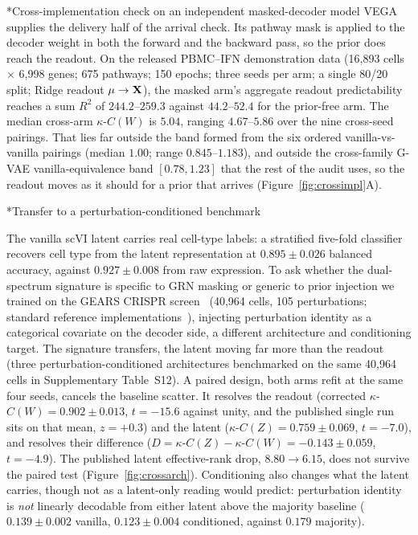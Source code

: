 \documentclass[11pt,a4paper]{article}
\makeatletter
\renewcommand{\subsection}{\@startsection{subsection}{2}{0pt}{10pt plus 4pt}{4pt}{\normalsize\bfseries}}
\makeatother
\begin{document}
\subsection*{Cross-implementation check on an independent masked-decoder model}
VEGA supplies the delivery half of the arrival check. Its pathway mask is applied to the decoder weight in both the forward and the backward pass, so the prior does reach the readout. On the released PBMC--IFN demonstration data (16,893 cells $\times$ 6,998 genes; 675 pathways; 150 epochs; three seeds per arm; a single 80/20 split; Ridge readout $\mu\to\mathbf{X}$), the masked arm's aggregate readout predictability reaches a sum $R^2$ of $244.2$--$259.3$ against $44.2$--$52.4$ for the prior-free arm. The median cross-arm $\kappa$-$C(W)$ is $5.04$, ranging $4.67$--$5.86$ over the nine cross-seed pairings. That lies far outside the band formed from the six ordered vanilla-vs-vanilla pairings (median $1.00$; range $0.845$--$1.183$), and outside the cross-family G-VAE vanilla-equivalence band $[0.78,1.23]$ that the rest of the audit uses, so the readout moves as it should for a prior that arrives (Figure~\ref{fig:crossimpl}A).

\subsection*{Transfer to a perturbation-conditioned benchmark}

The vanilla scVI latent carries real cell-type labels: a stratified five-fold classifier recovers cell type from the latent representation at $0.895\pm0.026$ balanced accuracy, against $0.927\pm0.008$ from raw expression. To ask whether the dual-spectrum signature is specific to GRN masking or generic to prior injection we trained on the GEARS CRISPR screen~\cite{roohani2024} (40,964 cells, 105 perturbations; standard reference implementations~\cite{dixit2016,replogle2022}), injecting perturbation identity as a categorical covariate on the decoder side, a different architecture and conditioning target. The signature transfers, the latent moving far more than the readout (three perturbation-conditioned architectures benchmarked on the same 40,964 cells in Supplementary Table~S12). A paired design, both arms refit at the same four seeds, cancels the baseline scatter. It resolves the readout (corrected $\kappa$-$C(W)=0.902\pm0.013$, $t=-15.6$ against unity, and the published single run sits on that mean, $z=+0.3$) and the latent ($\kappa$-$C(Z)=0.759\pm0.069$, $t=-7.0$), and resolves their difference ($D=\kappa$-$C(Z)-\kappa$-$C(W)=-0.143\pm0.059$, $t=-4.9$). The published latent effective-rank drop, $8.80\to6.15$, does not survive the paired test (Figure~\ref{fig:crossarch}). Conditioning also changes what the latent carries, though not as a latent-only reading would predict: perturbation identity is \emph{not} linearly decodable from either latent above the majority baseline ($0.139\pm0.002$ vanilla, $0.123\pm0.004$ conditioned, against $0.179$ majority). 
\end{document}

